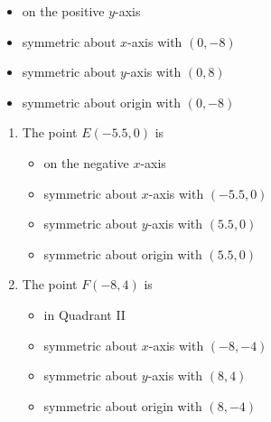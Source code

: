 \documentclass{ximera}
\begin{document}
\begin{enumerate}
\begin{multicols}{2}
\begin{enumerate}
\begin{itemize}

\item on the positive $y$-axis
\item symmetric about $x$-axis with $(0, -8)$
\item symmetric about $y$-axis with $(0, 8)$
\item symmetric about origin with $(0, -8)$

\end{itemize}


\setcounter{HWindent}{\value{enumii}}
\end{enumerate}
\end{multicols}

\begin{multicols}{2}
\begin{enumerate}
\setcounter{enumii}{\value{HWindent}}

\item The point $E(-5.5, 0)$ is 

\begin{itemize}

\item on the negative $x$-axis
\item symmetric about $x$-axis with $(-5.5, 0)$
\item symmetric about $y$-axis with $(5.5, 0)$
\item symmetric about origin with $(5.5, 0)$

\end{itemize}

\item The point $F(-8, 4)$ is 

\begin{itemize}

\item in Quadrant II
\item symmetric about $x$-axis with $(-8, -4)$
\item symmetric about $y$-axis with $(8, 4)$
\item symmetric about origin with $(8, -4)$

\end{itemize}

\setcounter{HWindent}{\value{enumii}}
\end{enumerate}
\end{multicols}

\begin{multicols}{2}
\begin{enumerate}
\setcounter{enumii}{\value{HWindent}}


\end{enumerate}
\end{multicols}
\end{enumerate}
\end{document}
